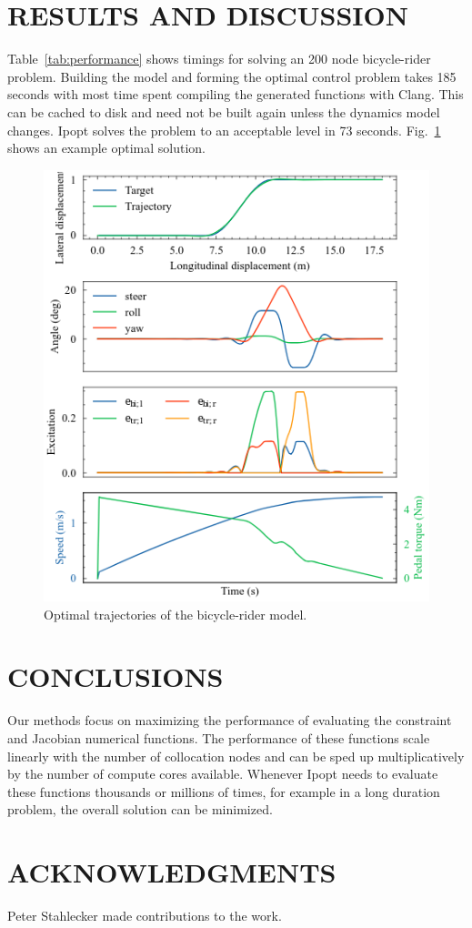 \documentclass[11pt,twocolumn]{article}
\begin{document}
\section*{RESULTS AND DISCUSSION}
\vspace{-1em}
\pagestyle{empty}
%
Table~\ref{tab:performance} shows timings for solving an 200 node bicycle-rider
problem. Building the model and forming the optimal control problem takes 185
seconds with most time spent compiling the generated functions with Clang. This
can be cached to disk and need not be built again unless the dynamics model
changes. Ipopt solves the problem to an acceptable level in 73 seconds.
Fig.~\ref{fig:trajectories} shows an example optimal solution.
%
\begin{figure}
    \centering
    \includegraphics[width=0.85\linewidth]{figures/arm-muscle-bicycle-excitation.png}
    \caption{\small Optimal trajectories of the bicycle-rider model.}
    \label{fig:trajectories}
\end{figure}


\vspace{-1em}
\section*{CONCLUSIONS}
\vspace{-1em}
%
Our methods focus on maximizing the performance of evaluating the constraint
and Jacobian numerical functions. The performance of these functions scale
linearly with the number of collocation nodes and can be sped up
multiplicatively by the number of compute cores available. Whenever Ipopt needs
to evaluate these functions thousands or millions of times, for example in a
long duration problem, the overall solution can be minimized.

\vspace{-1em}



\vspace{-1em}
\section*{ACKNOWLEDGMENTS}
\vspace{-1em}
%
Peter Stahlecker made contributions to the work.
\end{document}
